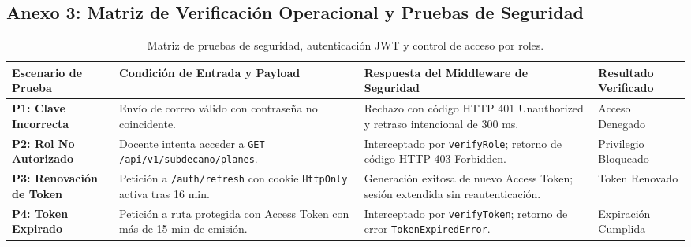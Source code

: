 \documentclass[12pt,a4paper]{article}
\begin{document}
\subsection*{Anexo 3: Matriz de Verificación Operacional y Pruebas de Seguridad}
\begin{table}[H]
\centering
\small
\renewcommand{\arraystretch}{1.15}
\begin{tabularx}{\textwidth}{|>{\hsize=0.75\hsize\raggedright\arraybackslash\bfseries\footnotesize}X|>{\hsize=1.25\hsize\raggedright\arraybackslash\footnotesize}X|>{\hsize=1.35\hsize\raggedright\arraybackslash\footnotesize}X|>{\hsize=0.65\hsize\centering\arraybackslash\footnotesize}X|}
\hline
\rowcolor{tableheader}
\textbf{Escenario de Prueba} & \textbf{Condición de Entrada y Payload} & \textbf{Respuesta del Middleware de Seguridad} & \textbf{Resultado Verificado} \\
\hline
P1: Clave Incorrecta & Envío de correo válido con contraseña no coincidente. & Rechazo con código HTTP 401 Unauthorized y retraso intencional de 300 ms. & Acceso Denegado \\
\hline
P2: Rol No Autorizado & Docente intenta acceder a \texttt{GET /\allowbreak  api/\allowbreak  v1/\allowbreak  subdecano/\allowbreak  planes}. & Interceptado por \texttt{verifyRole}; retorno de código HTTP 403 Forbidden. & Privilegio Bloqueado \\
\hline
P3: Renovación de Token & Petición a \texttt{/\allowbreak  auth/\allowbreak  refresh} con cookie \texttt{HttpOnly} activa tras 16 min. & Generación exitosa de nuevo Access Token; sesión extendida sin reautenticación. & Token Renovado \\
\hline
P4: Token Expirado & Petición a ruta protegida con Access Token con más de 15 min de emisión. & Interceptado por \texttt{verifyToken}; retorno de error \texttt{TokenExpiredError}. & Expiración Cumplida \\
\hline
\end{tabularx}
\caption{Matriz de pruebas de seguridad, autenticación JWT y control de acceso por roles.}
\end{table}
\end{document}
